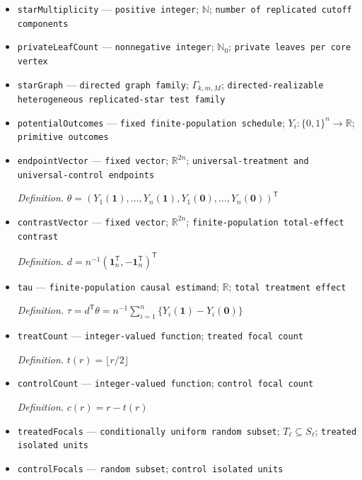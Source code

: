 \documentclass{article}
\begin{document}
\begin{itemize}
  \item \texttt{starMultiplicity} --- \texttt{positive integer}; \(\mathbb N\); \texttt{number of replicated cutoff components}
  \item \texttt{privateLeafCount} --- \texttt{nonnegative integer}; \(\mathbb N_0\); \texttt{private leaves per core vertex}
  \item \texttt{starGraph} --- \texttt{directed graph family}; \(\Gamma_{k,m,M}\); \texttt{directed-\allowbreak{}realizable heterogeneous replicated-\allowbreak{}star test family}
  \item \texttt{potentialOutcomes} --- \texttt{fixed finite-\allowbreak{}population schedule}; \(Y_i:\{0,1\}^n\to\mathbb R\); \texttt{primitive outcomes}
  \item \texttt{endpointVector} --- \texttt{fixed vector}; \(\mathbb R^{2n}\); \texttt{universal-\allowbreak{}treatment and universal-\allowbreak{}control endpoints}
  \par\smallskip\noindent\emph{Definition.} \(\theta=(Y_1(\mathbf 1),\ldots,Y_n(\mathbf 1),Y_1(\mathbf 0),\ldots,Y_n(\mathbf 0))^{\mathsf T}\)
  \item \texttt{contrastVector} --- \texttt{fixed vector}; \(\mathbb R^{2n}\); \texttt{finite-\allowbreak{}population total-\allowbreak{}effect contrast}
  \par\smallskip\noindent\emph{Definition.} \(d=n^{-1}(\mathbf 1_n^{\mathsf T},-\mathbf 1_n^{\mathsf T})^{\mathsf T}\)
  \item \texttt{tau} --- \texttt{finite-\allowbreak{}population causal estimand}; \(\mathbb R\); \texttt{total treatment effect}
  \par\smallskip\noindent\emph{Definition.} \(\tau=d^{\mathsf T}\theta=n^{-1}\sum_{i=1}^n\{Y_i(\mathbf 1)-Y_i(\mathbf 0)\}\)
  \item \texttt{treatCount} --- \texttt{integer-\allowbreak{}valued function}; \texttt{treated focal count}
  \par\smallskip\noindent\emph{Definition.} \(t(r)=\lfloor r/2\rfloor\)
  \item \texttt{controlCount} --- \texttt{integer-\allowbreak{}valued function}; \texttt{control focal count}
  \par\smallskip\noindent\emph{Definition.} \(c(r)=r-t(r)\)
  \item \texttt{treatedFocals} --- \texttt{conditionally uniform random subset}; \(T_{\ell}\subseteq S_{\ell}\); \texttt{treated isolated units}
  \item \texttt{controlFocals} --- \texttt{random subset}; \texttt{control isolated units}

\end{itemize}
\end{document}
